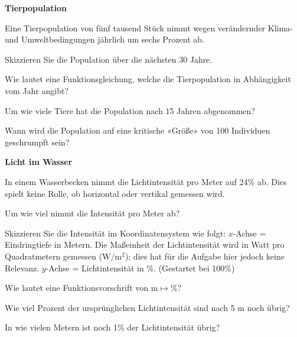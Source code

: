 

\bbwActAufgabenNr{} \textbf{Tierpopulation}

Eine Tierpopulation von fünf tausend Stück nimmt wegen verändernder Klima-
und Umweltbedingungen jährlich um sechs Prozent ab.


\begin{bbwAufgabenBlock}

\item Skizzieren Sie die Population über die nächsten 30 Jahre.
\item Wie lautet eine Funktionsgleichung, welche die Tierpopulation in
  Abhängigkeit vom Jahr angibt?
\item Um wie viele Tiere hat die Population nach 15 Jahren abgenommen?


  

\item Wann wird die Population auf eine kritische «Größe» von 100
  Individuen geschrumpft sein?
\end{bbwAufgabenBlock}
\platzFuerBerechnungenBisEndeSeite{}



\bbwActAufgabenNr{} \textbf{Licht im Wasser}

In einem Wasserbecken nimmt die Lichtintensität pro Meter auf 24\% ab.
Dies spielt keine Rolle, ob horizontal oder vertikal gemessen wird.


\begin{bbwAufgabenBlock}

 \item Um wie viel nimmt die Intensität pro Meter ab? 
  
\item Skizzieren Sie die Intensität im Koordinatensystem wie folgt:
   $x$-Achse = Eindringtiefe in Metern. Die Maßeinheit der
   Lichtintensität wird in Watt pro Quadratmetern gemessen ($\textrm{W}/\textrm{m}^2$); dies
   hat für die Aufgabe hier jedoch keine Relevanz.
   $y$-Achse = Lichtintensität in \%. (Gestartet bei 100\%)
\item Wie lautet eine Funktionsvorschrift von $\textrm{m}\mapsto \%$?
\item Wie viel Prozent der ursprünglichen Lichtintensität sind nach 5
   m noch übrig? 

\item In wie vielen Metern ist noch 1\% der Lichtintensität übrig?
\end{bbwAufgabenBlock}
\platzFuerBerechnungenBisEndeSeite{}


